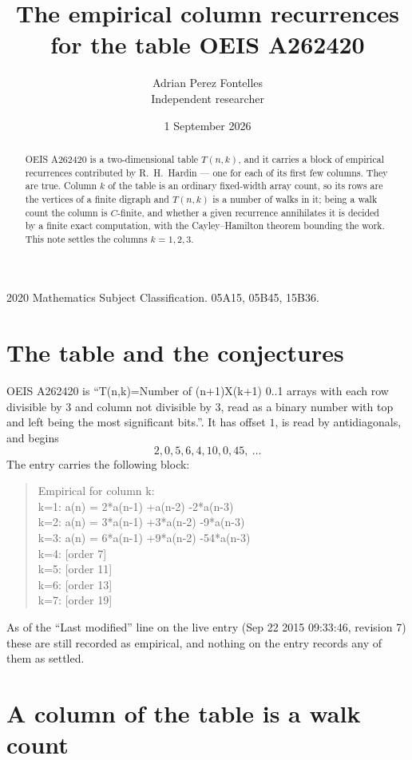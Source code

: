 \documentclass[11pt,a4paper]{article}
\title{The empirical column recurrences for the table OEIS A262420}
\author{Adrian Perez Fontelles\\ \small Independent researcher}
\date{1 September 2026}
\theoremstyle{plain}
\theoremstyle{definition}
\begin{document}
\maketitle

\begin{abstract}
OEIS A262420 is a two-dimensional table $T(n,k)$, and it carries a block of empirical
recurrences contributed by R.~H.~Hardin --- one for each of its first few columns. They are
true. Column $k$ of the table is an ordinary fixed-width array count, so its rows are the
vertices of a finite digraph and $T(n,k)$ is a number of walks in it; being a walk count the
column is $C$-finite, and whether a given recurrence annihilates it is decided by a finite
exact computation, with the Cayley--Hamilton theorem bounding the work. This note settles the columns $k=1, 2, 3$.
\end{abstract}

\noindent\small 2020 Mathematics Subject Classification. 05A15, 05B45, 15B36.\normalsize

\section{The table and the conjectures}

OEIS A262420 is ``T(n,k)=Number of (n+1)X(k+1) 0..1 arrays with each row divisible by 3 and column not divisible by 3, read as a binary number with top and left being the most significant bits.''. It has offset $1$, is
read by antidiagonals, and begins
\[
2, 0, 5, 6, 4, 10, 0, 45,\ \dots
\]
The entry carries the following block:
\begin{quote}\small
Empirical for column k:\\
k=1: a(n) = 2*a(n-1) +a(n-2) -2*a(n-3)\\
k=2: a(n) = 3*a(n-1) +3*a(n-2) -9*a(n-3)\\
k=3: a(n) = 6*a(n-1) +9*a(n-2) -54*a(n-3)\\
k=4: [order 7]\\
k=5: [order 11]\\
k=6: [order 13]\\
k=7: [order 19]\\
\end{quote}
As of the ``Last modified'' line on the live entry (Sep 22 2015 09:33:46, revision 7) these are still
recorded as empirical, and nothing on the entry records any of them as settled.

\section{A column of the table is a walk count}
\end{document}
